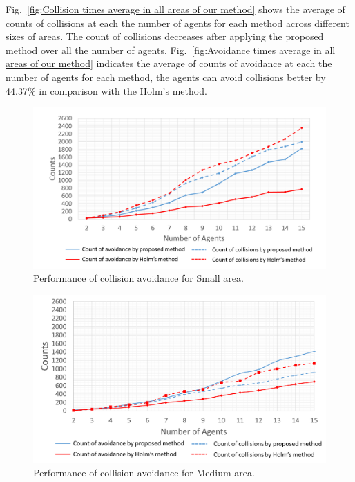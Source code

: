 Fig.~\ref{fig:Collision times average in all areas of our method} shows the average of counts of collisions at each the number of agents for each method across different sizes of areas. The count of collisions decreases after applying the proposed method over all the number of agents.  Fig.~\ref{fig:Avoidance times average in all areas of our method} indicates the average of counts of avoidance at each the number of agents for each method, the agents can avoid collisions better by 44.37\% in comparison with the Holm's method.

\newpage

\begin{figure}[H]\centering
	\includegraphics[width=1.0\textwidth]{Pictures/Area of 75 Percent.png}%
	\caption{Performance of collision avoidance for Small area.}\label{fig:Area of 75 Percent}%
	
\end{figure}

\begin{figure}[H]\centering
	\includegraphics[width=1.0\textwidth]{Pictures/Area of 100 Percent.png}%
	\caption{Performance of collision avoidance for Medium area.}\label{fig:Area of 100 Percent}%
	
\end{figure}


